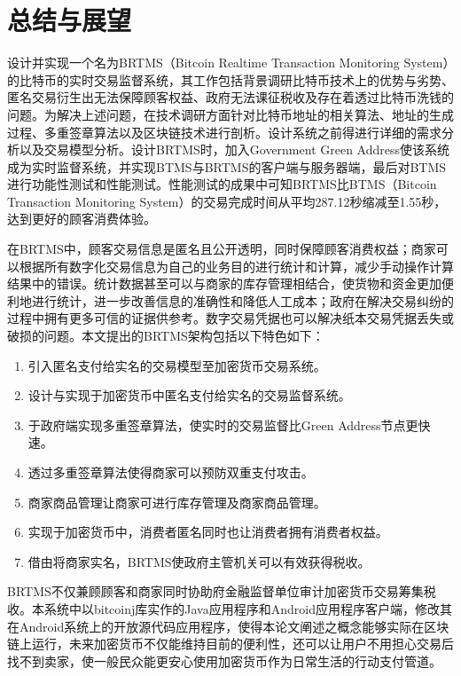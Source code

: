   
\chapter{总结与展望}
设计并实现一个名为BRTMS（Bitcoin Realtime Transaction Monitoring System）的比特币的实时交易监督系统，其工作包括背景调研比特币技术上的优势与劣势、匿名交易衍生出无法保障顾客权益、政府无法课征税收及存在着透过比特币洗钱的问题。为解决上述问题，在技术调研方面针对比特币地址的相关算法、地址的生成过程、多重签章算法以及区块链技术进行剖析。设计系统之前得进行详细的需求分析以及交易模型分析。设计BRTMS时，加入Government Green Address使该系统成为实时监督系统，并实现BTMS与BRTMS的客户端与服务器端，最后对BTMS进行功能性测试和性能测试。性能测试的成果中可知BRTMS比BTMS（Bitcoin Transaction Monitoring System）的交易完成时间从平均287.12秒缩减至1.55秒，达到更好的顾客消费体验。

在BRTMS中，顾客交易信息是匿名且公开透明，同时保障顾客消费权益；商家可以根据所有数字化交易信息为自己的业务目的进行统计和计算，减少手动操作计算结果中的错误。统计数据甚至可以与商家的库存管理相结合，使货物和资金更加便利地进行统计，进一步改善信息的准确性和降低人工成本；政府在解决交易纠纷的过程中拥有更多可信的证据供参考。数字交易凭据也可以解决纸本交易凭据丢失或破损的问题。本文提出的BRTMS架构包括以下特色如下：
		\begin{enumerate}
			\item 引入匿名支付给实名的交易模型至加密货币交易系统。
			\item 设计与实现于加密货币中匿名支付给实名的交易监督系统。
			\item 于政府端实现多重签章算法，使实时的交易监督比Green Address节点更快速。
			\item 透过多重签章算法使得商家可以预防双重支付攻击。
			\item 商家商品管理让商家可进行库存管理及商家商品管理。
			\item 实现于加密货币中，消费者匿名同时也让消费者拥有消费者权益。
			\item 借由将商家实名，BRTMS使政府主管机关可以有效获得税收。
		\end{enumerate}



		
BRTMS不仅兼顾顾客和商家同时协助府金融监督单位审计加密货币交易筹集税收。本系统中以bitcoinj库实作的Java应用程序和Android应用程序客户端，修改其在Android系统上的开放源代码应用程序，使得本论文阐述之概念能够实际在区块链上运行，未来加密货币不仅能维持目前的便利性，还可以让用户不用担心交易后找不到卖家，使一般民众能更安心使用加密货币作为日常生活的行动支付管道。
